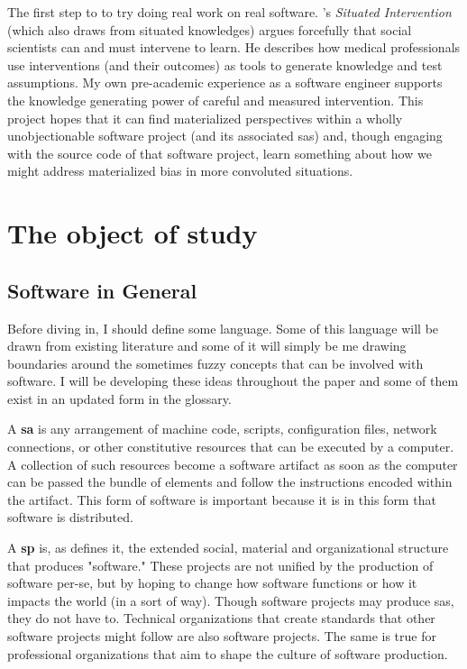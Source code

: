 \documentclass[a4paper,man,natbib,floatsintext]{apa6}
\begin{document}
  The first step to to try doing real work on real software. \citet{Zuiderent-Jerak2015-go}'s \textit{Situated Intervention} (which also draws from situated knowledges) argues forcefully that social scientists can and must intervene to learn. He describes how medical professionals use interventions (and their outcomes) as tools to generate knowledge and test assumptions. My own pre-academic experience as a software engineer supports the knowledge generating power of careful and measured intervention. This project hopes that it can find materialized perspectives within a wholly unobjectionable software project (and its associated \glspl{sa}) and, though engaging with the source code of that software project, learn something about how we might address materialized bias in more convoluted situations.



  \section{The object of study}
  \subsection{Software in General}
  Before diving in, I should define some language. Some of this language will be drawn from existing literature and some of it will simply be me drawing boundaries around the sometimes fuzzy concepts that can be involved with software. I will be developing these ideas throughout the paper and some of them exist in an updated form in the glossary.

  A \textbf{\gls{sa}} is any arrangement of machine code, scripts, configuration files, network connections, or other constitutive resources that can be executed by a computer. A collection of such resources become a software artifact as soon as the computer can be passed the bundle of elements and follow the instructions encoded within the artifact. This form of software is important because it is in this form that software is distributed.

  A \textbf{\gls{sp}} is, as \citet{Mackenzie2006-hb} defines it, the extended social, material and organizational structure that produces "software." These projects are not unified by the production of software per-se, but by hoping to change how software functions or how it impacts the world (in a \citet{Kitchin2011-af} sort of way). Though software projects may produce \glspl{sa}, they do not have to. Technical organizations that create standards that other software projects might follow are also software projects. The same is true for professional organizations that aim to shape the culture of software production. 
\end{document}
